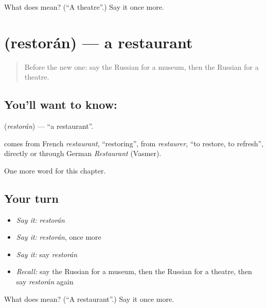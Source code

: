 \begin{tcolorbox}[breakable,colback=teal!4,colframe=teal!35!black,title={Before you move on}]
What does  mean? (\textquotedblleft{}A theatre\textquotedblright{}.) Say it once more.
\end{tcolorbox}
\section[\texorpdfstring{\ru{ресторан} (restorán)}{ресторан (restorán)}]{ (restorán) — a restaurant}

\label{lesson:RU-C78-restaurant}



\begin{quote}
Before the new one: say the Russian for a museum, then the Russian for a theatre.
\end{quote}

\subsection*{You'll want to know: }
\textbf{} (\emph{restorán}) — \textquotedblleft{}a restaurant\textquotedblright{}.

\begin{cousinweb}
\textbf{} comes from French \emph{restaurant}, \textquotedblleft{}restoring\textquotedblright{}, from \emph{restaurer}, \textquotedblleft{}to restore, to refresh\textquotedblright{}, directly or through German \emph{Restaurant} (Vasmer).
\end{cousinweb}

\begin{grammarlens}[title={What you've built}]
One more word for this chapter.
\end{grammarlens}

\subsection*{Your turn}
\begin{itemize}
\raggedright
  \item \emph{Say it:} \emph{restorán}
  \item \emph{Say it:} \emph{restorán}, once more
  \item \emph{Say it:} say \emph{restorán}
  \item \emph{Recall:} say the Russian for a museum, then the Russian for a theatre, then say \emph{restorán} again
\end{itemize}

\begin{tcolorbox}[breakable,colback=teal!4,colframe=teal!35!black,title={Before you move on}]
What does  mean? (\textquotedblleft{}A restaurant\textquotedblright{}.) Say it once more.
\end{tcolorbox}
